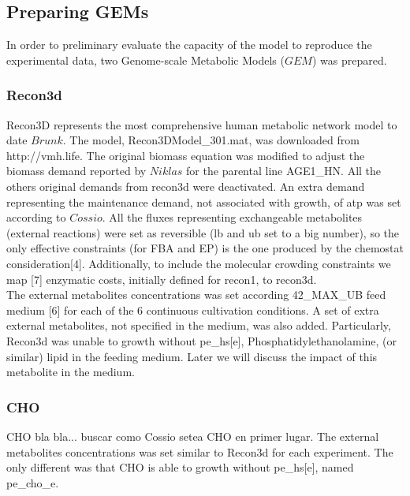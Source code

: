 \documentclass[]{article}
\begin{document}

\subsection{Preparing GEMs} %
	
	In order to preliminary evaluate the capacity of the model to reproduce the experimental data, two Genome-scale Metabolic Models ($GEM$) was prepared.
	
	\subsubsection{Recon3d}

	Recon3D represents the most comprehensive human metabolic network model to date $Brunk$. The model,
	Recon3DModel\_301.mat, was downloaded from http://vmh.life. The original biomass equation was modified to adjust the biomass demand reported by $Niklas$ for the parental line AGE1\_HN. All the others original demands from recon3d were deactivated. An extra demand representing the maintenance demand, not associated with growth, of atp was set according to $Cossio$. All the fluxes representing exchangeable metabolites (external reactions) were set as reversible (lb and ub set to a big number), so the only effective constraints (for FBA and EP) is the one produced by the chemostat consideration[4]. Additionally, to include the molecular crowding constraints we map [7] enzymatic costs, initially defined for recon1, to recon3d.\\
	The external metabolites concentrations was set according 42\_MAX\_UB feed medium [6] for each of the 6 continuous cultivation conditions. A set of extra external metabolites, not specified in the medium, was also added. Particularly, Recon3d was unable to growth without pe\_hs[e], Phosphatidylethanolamine,  (or similar) lipid in the feeding medium. Later we will discuss the impact of this metabolite in the medium.
	
	\subsubsection{CHO}
	
	CHO bla bla... buscar como Cossio setea CHO en primer lugar.  The external metabolites concentrations was set similar to Recon3d for each experiment. The only different was that CHO is able to growth without pe\_hs[e], named pe\_cho\_e. 
	
\end{document}
